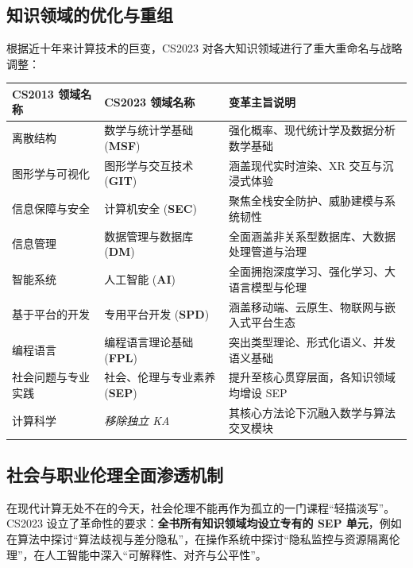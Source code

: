 \subsection{知识领域的优化与重组}
根据近十年来计算技术的巨变，CS2023 对各大知识领域进行了重大重命名与战略调整：
\begin{table}[htbp]
\centering\small
\begin{tabularx}{\textwidth}{lXl}
\toprule
\textbf{CS2013 领域名称} & \textbf{CS2023 领域名称} & \textbf{变革主旨说明} \\
\midrule
离散结构 & 数学与统计学基础 (\textbf{MSF}) & 强化概率、现代统计学及数据分析数学基础 \\
图形学与可视化 & 图形学与交互技术 (\textbf{GIT}) & 涵盖现代实时渲染、XR 交互与沉浸式体验 \\
信息保障与安全 & 计算机安全 (\textbf{SEC}) & 聚焦全栈安全防护、威胁建模与系统韧性 \\
信息管理 & 数据管理与数据库 (\textbf{DM}) & 全面涵盖非关系型数据库、大数据处理管道与治理 \\
智能系统 & 人工智能 (\textbf{AI}) & 全面拥抱深度学习、强化学习、大语言模型与伦理 \\
基于平台的开发 & 专用平台开发 (\textbf{SPD}) & 涵盖移动端、云原生、物联网与嵌入式平台生态 \\
编程语言 & 编程语言理论基础 (\textbf{FPL}) & 突出类型理论、形式化语义、并发语义基础 \\
社会问题与专业实践 & 社会、伦理与专业素养 (\textbf{SEP}) & 提升至核心贯穿层面，各知识领域均增设 SEP \\
计算科学 & \emph{移除独立 KA} & 其核心方法论下沉融入数学与算法交叉模块 \\
\bottomrule
\end{tabularx}
\end{table}

\subsection{社会与职业伦理全面渗透机制}
在现代计算无处不在的今天，社会伦理不能再作为孤立的一门课程“轻描淡写”。CS2023 设立了革命性的要求：\textbf{全书所有知识领域均设立专有的 SEP 单元}，例如在算法中探讨“算法歧视与差分隐私”，在操作系统中探讨“隐私监控与资源隔离伦理”，在人工智能中深入“可解释性、对齐与公平性”。

